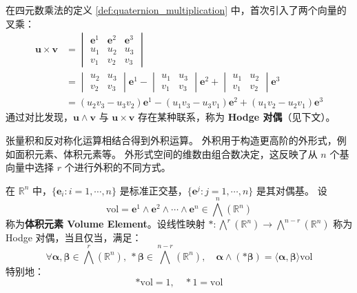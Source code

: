 \begin{example}[三维欧氏空间的向量外积]
    在四元数乘法的定义 \ref{def:quaternion_multiplication} 中，首次引入了两个向量的叉乘：
    \begin{align*}
        \mathbf{u} \times \mathbf{v} &= \begin{vmatrix}
            \mathbf{e}^1 & \mathbf{e}^2 & \mathbf{e}^3 \\
            u_1 & u_2 & u_3 \\
            v_1 & v_2 & v_3
        \end{vmatrix}\\
        &= \begin{vmatrix}
            u_2 & u_3 \\
            v_2 & v_3
        \end{vmatrix}\mathbf{e}^1 -
        \begin{vmatrix}
            u_1 & u_3 \\
            v_1 & v_3
        \end{vmatrix}\mathbf{e}^2 +
        \begin{vmatrix}
            u_1 & u_2 \\
            v_1 & v_2
        \end{vmatrix}\mathbf{e}^3\\
        &= (u_2v_3 - u_3v_2)\mathbf{e}^1 - (u_1v_3 - u_3v_1)\mathbf{e}^2 + (u_1v_2 - u_2v_1)\mathbf{e}^3
    \end{align*}
    通过对比发现，$\mathbf{u}\wedge \mathbf{v}$ 与 $\mathbf{u} \times \mathbf{v}$ 存在某种联系，称为 \textbf{Hodge 对偶}（见下文）。
    \label{ex:exterior_product_R3}
\end{example}

\begin{note}
    张量积和反对称化运算相结合得到外积运算。
    外积用于构造更高阶的外形式，例如面积元素、体积元素等。
    外形式空间的维数由组合数决定，这反映了从 $n$ 个基向量中选择 $r$ 个进行外积的不同方式。
\end{note}
\vspace{1em}

\begin{definition}
    在 $\mathbb{R}^n$ 中，$\{\mathbf{e}_i:i=1,\cdots,n\}$ 是标准正交基，$\{\mathbf{e}^j:j=1,\cdots,n\}$ 是其对偶基。
    设
    \[
        \mathrm{vol} = \mathbf{e}^1 \wedge \mathbf{e}^2 \wedge \cdots \wedge \mathbf{e}^n \in \bigwedge^n(\mathbb{R}^n)
    \]
    称为\textbf{体积元素 Volume Element}。设线性映射 $*: \bigwedge^r(\mathbb{R}^n) \to \bigwedge^{n-r}(\mathbb{R}^n)$ 称为 Hodge 对偶，当且仅当，满足：
    \[
        \forall \bm{\alpha,\beta} \in \bigwedge^r(\mathbb{R}^n),\ *\bm{\beta} \in \bigwedge^{n-r}(\mathbb{R}^n),\quad
        \bm{\alpha} \wedge (*\bm{\beta}) = \langle \bm{\alpha},\bm{\beta} \rangle \mathrm{vol}
    \]
    特别地：
    \[
        *\mathrm{vol} = 1,\quad *1 = \mathrm{vol}
    \]
\end{definition}

